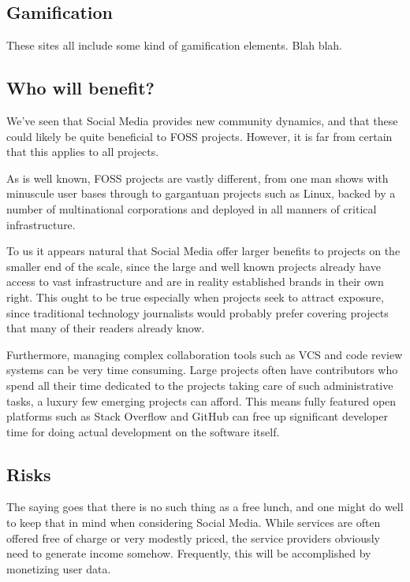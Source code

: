 \documentclass[a4paper,11pt]{article} %
\begin{document}
\subsection{Gamification}

These sites all include some kind of gamification elements. Blah blah.

\subsection{Who will benefit?}

We've seen that Social Media provides new community dynamics, and that
these could likely be quite beneficial to FOSS projects. However, it
is far from certain that this applies to all projects.

As is well known, FOSS projects are vastly different, from one man
shows with minuscule user bases through to gargantuan projects such as
Linux, backed by a number of multinational corporations and deployed
in all manners of critical infrastructure.

To us it appears natural that Social Media offer larger benefits to
projects on the smaller end of the scale, since the large and well
known projects already have access to vast infrastructure and are in
reality established brands in their own right. This ought to be true
especially when projects seek to attract exposure, since traditional
technology journalists would probably prefer covering projects that
many of their readers already know.

Furthermore, managing complex collaboration tools such as VCS and code
review systems can be very time consuming. Large projects often have
contributors who spend all their time dedicated to the projects taking
care of such administrative tasks, a luxury few emerging projects can
afford. This means fully featured open platforms such as Stack
Overflow and GitHub can free up significant developer time for doing
actual development on the software itself.

\subsection{Risks}

The saying goes that there is no such thing as a free lunch, and one
might do well to keep that in mind when considering Social
Media. While services are often offered free of charge or very
modestly priced, the service providers obviously need to generate
income somehow. Frequently, this will be accomplished by monetizing
user data.
\end{document}
